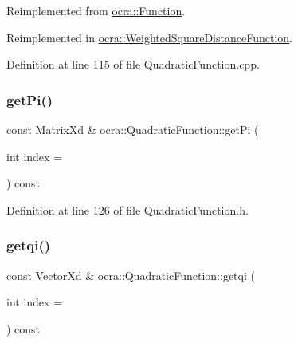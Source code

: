 Reimplemented from \hyperlink{classocra_1_1Function_a39f6d91b72eff2d32da7e4a85ee79f7d}{ocra\+::\+Function}.



Reimplemented in \hyperlink{classocra_1_1WeightedSquareDistanceFunction_ab05ab6021a40ed308b7e0d67b5a55b82}{ocra\+::\+Weighted\+Square\+Distance\+Function}.



Definition at line 115 of file Quadratic\+Function.\+cpp.

\hypertarget{classocra_1_1QuadraticFunction_aa848353fa3e2a2330acdf3fa5b3f8ee3}{}\label{classocra_1_1QuadraticFunction_aa848353fa3e2a2330acdf3fa5b3f8ee3} 
\subsubsection{\texorpdfstring{get\+Pi()}{getPi()}}
{\footnotesize\ttfamily const Matrix\+Xd \& ocra\+::\+Quadratic\+Function\+::get\+Pi (\begin{DoxyParamCaption}\item[{int}]{index = {} }\end{DoxyParamCaption}) const\hspace{0.3cm}{\ttfamily [inline]}}



Definition at line 126 of file Quadratic\+Function.\+h.

\hypertarget{classocra_1_1QuadraticFunction_a5735e7a900aabcf856e9df0c00e0cd06}{}\label{classocra_1_1QuadraticFunction_a5735e7a900aabcf856e9df0c00e0cd06} 
\subsubsection{\texorpdfstring{getqi()}{getqi()}}
{\footnotesize\ttfamily const Vector\+Xd \& ocra\+::\+Quadratic\+Function\+::getqi (\begin{DoxyParamCaption}\item[{int}]{index = {} }\end{DoxyParamCaption}) const\hspace{0.3cm}{\ttfamily [inline]}}



